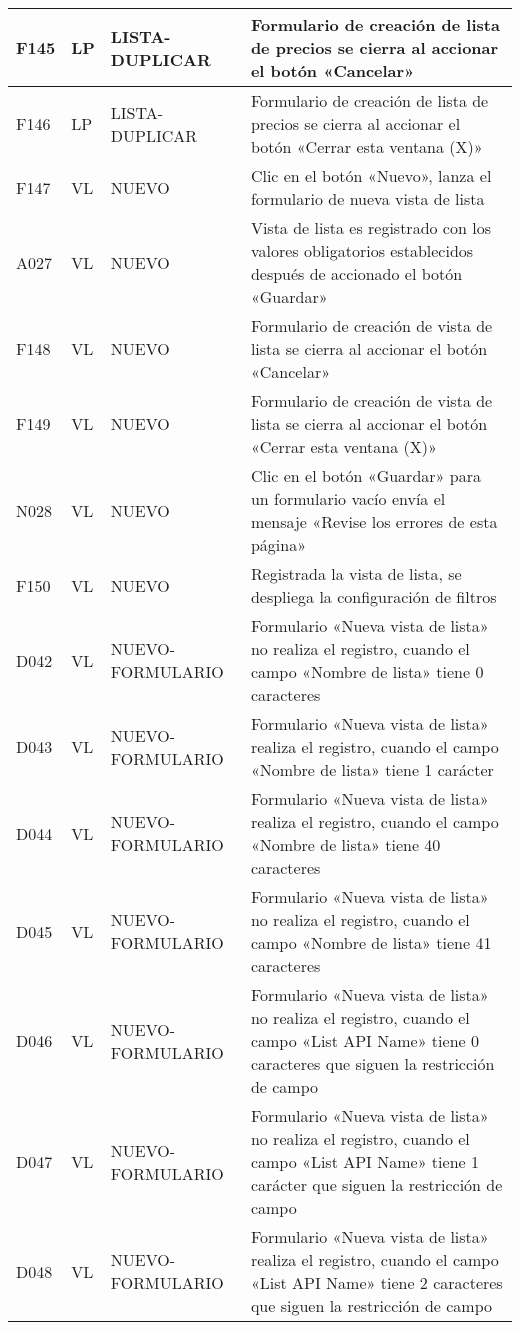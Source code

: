 \begin{landscape}
\begin{longtable}[htb]{|l|l|p{5.0cm}|p{13.0cm}|}
F145 & LP & LISTA-DUPLICAR & Formulario de creación de lista de precios se cierra al accionar el botón «Cancelar» \\ \hline
F146 & LP & LISTA-DUPLICAR & Formulario de creación de lista de precios se cierra al accionar el botón «Cerrar esta ventana (X)» \\ \hline
F147 & VL & NUEVO & Clic en el botón «Nuevo», lanza el formulario de nueva vista de lista \\ \hline
A027 & VL & NUEVO & Vista de lista es registrado con los valores obligatorios establecidos después de accionado el botón «Guardar» \\ \hline
F148 & VL & NUEVO & Formulario de creación de vista de lista se cierra al accionar el botón «Cancelar» \\ \hline
F149 & VL & NUEVO & Formulario de creación de vista de lista se cierra al accionar el botón «Cerrar esta ventana (X)» \\ \hline
N028 & VL & NUEVO & Clic en el botón «Guardar» para un formulario vacío envía el mensaje «Revise los errores de esta página» \\ \hline
F150 & VL & NUEVO & Registrada la vista de lista, se despliega la configuración de filtros \\ \hline
D042 & VL & NUEVO-FORMULARIO & Formulario «Nueva vista de lista» no realiza el registro, cuando el campo «Nombre de lista» tiene 0 caracteres \\ \hline
D043 & VL & NUEVO-FORMULARIO & Formulario «Nueva vista de lista» realiza el registro, cuando el campo «Nombre de lista» tiene 1 carácter \\ \hline
D044 & VL & NUEVO-FORMULARIO & Formulario «Nueva vista de lista» realiza el registro, cuando el campo «Nombre de lista» tiene 40 caracteres \\ \hline
D045 & VL & NUEVO-FORMULARIO & Formulario «Nueva vista de lista» no realiza el registro, cuando el campo «Nombre de lista» tiene 41 caracteres \\ \hline
D046 & VL & NUEVO-FORMULARIO & Formulario «Nueva vista de lista» no realiza el registro, cuando el campo «List API Name» tiene 0 caracteres que siguen la restricción de campo \\ \hline
D047 & VL & NUEVO-FORMULARIO & Formulario «Nueva vista de lista» no realiza el registro, cuando el campo «List API Name» tiene 1 carácter que siguen la restricción de campo \\ \hline
D048 & VL & NUEVO-FORMULARIO & Formulario «Nueva vista de lista» realiza el registro, cuando el campo «List API Name» tiene 2 caracteres que siguen la restricción de campo \\ \hline

\end{longtable}
\end{landscape}
